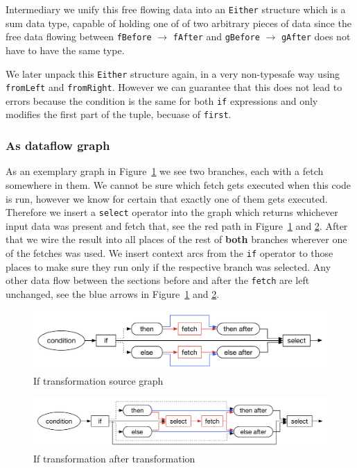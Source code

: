 Intermediary we unify this free flowing data into an \texttt{Either} structure which is a sum data type, capable of holding one of of two arbitrary pieces of data since the free data flowing between \texttt{fBefore} $\rightarrow$ \texttt{fAfter} and \texttt{gBefore} $\rightarrow$ \texttt{gAfter} does not have to have the same type.

We later unpack this \texttt{Either} structure again, in a very non-typesafe way using \texttt{fromLeft} and \texttt{fromRight}.
However we can guarantee that this does not lead to errors because the condition is the same for both \texttt{if} expressions and \fetch{} only modifies the first part of the tuple, becuase of \texttt{first}.

\subsubsection{As dataflow graph}

As an exemplary graph in Figure~\ref{fig:if-trans-before} we see two branches, each with a fetch somewhere in them.
We cannot be sure which fetch gets executed when this code is run, however we know for certain that exactly one of them gets executed.
Therefore we insert a \texttt{select} operator into the graph which returns whichever input data was present and fetch that, see the red path in Figure~\ref{fig:if-trans-before} and \ref{fig:if-trans-merged}.
After that we wire the result into all places of the rest of \textbf{both} branches wherever one of the fetches was used.
We insert context arcs from the \texttt{if} operator to those places to make sure they run only if the respective branch was selected.
Any other data flow between the sections before and after the \texttt{fetch} are left unchanged, see the blue arrows in Figure~\ref{fig:if-trans-before} and \ref{fig:if-trans-merged}.

\begin{figure}
    \includegraphics[width=\linewidth]{../Figures/if-trans-before}
    \caption{If transformation source graph}
    \label{fig:if-trans-before}
\end{figure}

\begin{figure}
    \includegraphics[width=\linewidth]{../Figures/if-trans-merged}
    \caption{If transformation after transformation}
    \label{fig:if-trans-merged}
\end{figure}

